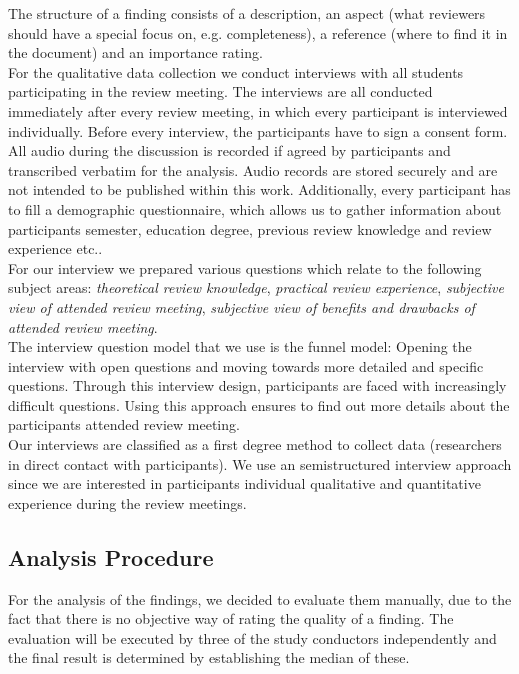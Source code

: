 The structure of a finding consists of a description, an aspect (what reviewers should have a special focus on, e.g. completeness), a reference (where to find it in the document) and an importance rating. \\

For the qualitative data collection we conduct interviews with all students participating in the review meeting. The interviews are all conducted immediately after every review meeting, in which every participant is interviewed individually.  Before every interview, the participants have to sign a consent form. All audio during the discussion is recorded if agreed by participants and transcribed verbatim for the analysis. Audio records are stored securely and are not intended to be published within this work. Additionally, every participant has to fill a demographic questionnaire, which allows us to gather information about participants semester, education degree, previous review knowledge and review experience etc.. \\
For our interview we prepared various questions which relate to the following subject areas: \textit{theoretical review knowledge}, \textit{practical review experience}, \textit{subjective view of attended review meeting}, \textit{subjective view of benefits and drawbacks of attended review meeting}.\\
The interview question model that we use is the funnel model: Opening the interview with open questions and moving towards more detailed and specific questions. Through this interview design, participants are faced with increasingly difficult questions.  Using this approach ensures to find out more details about the participants attended review meeting. \\
Our interviews are classified as a first degree method to collect data (researchers in direct contact with participants). We use an semistructured interview approach since we are interested in participants individual qualitative and quantitative experience during the review meetings.\\


\subsection{Analysis Procedure}

For the analysis of the findings, we decided to evaluate them manually, due to the fact that there is no objective way of rating the quality of a finding. The evaluation will be executed by three of the study conductors independently and the final result is determined by establishing the median of these.

